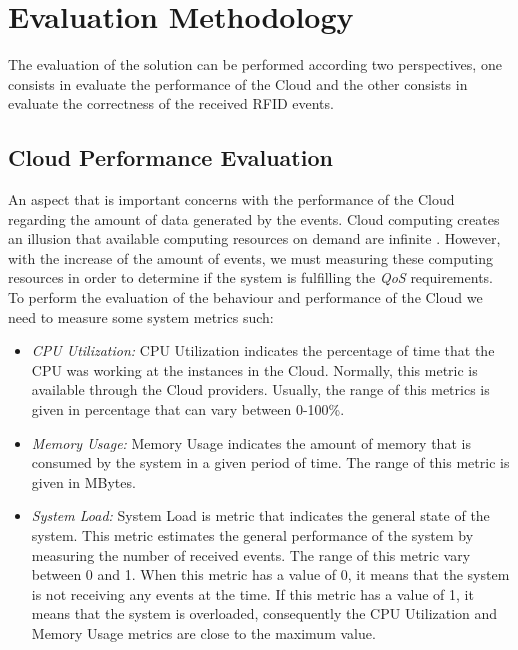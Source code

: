\section{Evaluation Methodology}
\label{sec:evaluation}
The evaluation of the solution can be performed according two perspectives, one consists in evaluate the performance of the Cloud and
the other consists in evaluate the correctness of the received RFID events.

\subsection{Cloud Performance Evaluation}
\label{subs:cloud_performance_evaluation}
An aspect that is important concerns with the performance of the Cloud regarding the amount of data generated by the events. Cloud computing creates an illusion that
available computing resources on demand are infinite \cite{armbrust2009m}. However, with the increase of the amount of events, we must measuring these computing resources
in order to determine if the system is fulfilling the \textit{QoS} requirements. To perform the evaluation of the behaviour and performance of the Cloud we need to measure
some system metrics such:
\begin{itemize}
  \item \textit{CPU Utilization:} CPU Utilization indicates the percentage of time that the CPU was working at the instances in the Cloud. Normally, this metric
  is available through the Cloud providers. Usually, the range of this metrics is given in percentage that can vary between 0-100\%.
  \item \textit{Memory Usage:} Memory Usage indicates the amount of memory that is consumed by the system in a given period of time. The range of this metric is given in
  MBytes.
  \item \textit{System Load:} System Load is metric that indicates the general state of the system. This metric estimates the general performance of the system by measuring
  the number of received events. The range of this metric vary between 0 and 1. When this metric has a value of 0, it means that the system is not receiving any events at
  the time. If this metric has a value of 1, it means that the system is overloaded, consequently the CPU Utilization and Memory Usage metrics are close to the maximum value.
\end{itemize}

